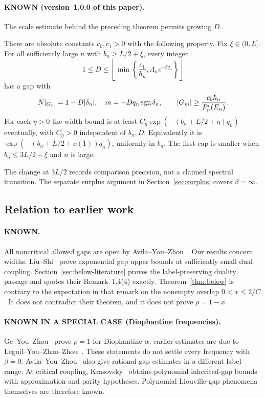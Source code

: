 \paragraph{KNOWN (version~1.0.0 of this paper).}
The scale estimate behind the preceding theorem permits growing $D$.
\begin{maintheorem}\label{thm:scale}
There are absolute constants $c_0,c_1>0$ with the following property. Fix $\xi\in(0,L]$. For all sufficiently large $n$ with $b_n\ge L/2+\xi$, every integer
\begin{equation}\label{eq:Dcap}
1\le D\le
\left\lfloor\min\left\{\frac{c_1}{\hbar_n},
                 \Lambda_ne^{-\xi q_n}\right\}\right\rfloor
\end{equation}
has a gap with
\begin{equation}\label{eq:width}
 N|_{G_m}=1-D|\delta_n|,\quad m=-Dq_n\operatorname{sgn}\delta_n,\qquad
 |G_m|\ge\frac{c_0\hbar_n}{P_n'(E_n)}.
\end{equation}
For each $\eta>0$ the width bound is at least
$C_\eta\exp(-(b_n+L/2+\eta)q_n)$ eventually, with $C_\eta>0$ independent of $b_n,D$.
Equivalently it is $\exp(-(b_n+L/2+o(1))q_n)$, uniformly in $b_n$.
The first cap is smaller when $b_n\le3L/2-\xi$ and $n$ is large.
\end{maintheorem}
The change at $3L/2$ records comparison precision, not a claimed spectral transition. The separate surplus argument in Section~\ref{sec:surplus} covers $\beta=\infty$.

\subsection{Relation to earlier work}
\paragraph{KNOWN.}
All noncritical allowed gaps are open by Avila--You--Zhou~\cite[Theorem~1.1]{AYZdry}. Our results concern widths. Liu--Shi~\cite[Theorem~1.3]{LiuShi2019} prove exponential gap upper bounds at sufficiently small dual coupling. Section~\ref{sec:below-literature} proves the label-preserving duality passage and quotes their Remark~1.4(4) exactly. Theorem~\ref{thm:below} is contrary to the expectation in that remark on the nonempty overlap $0<x\le2/C$. It does not contradict their theorem, and it does not prove $\rho=1-x$.

\paragraph{KNOWN IN A SPECIAL CASE (Diophantine frequencies).}
Ge--You--Zhou~\cite[Theorem~1.1]{GYZ} prove $\rho=1$ for Diophantine $\alpha$; earlier estimates are due to Leguil--You--Zhao--Zhou~\cite{LYZZ2017}. These statements do not settle every frequency with $\beta=0$. Avila--You--Zhou~\cite[Theorem~6.2]{AYZdry} also give rational-gap estimates in a different label range. At critical coupling, Krasovsky~\cite[Theorems~3--4]{Krasovsky} obtains polynomial inherited-gap bounds with approximation and parity hypotheses. Polynomial Liouville-gap phenomena themselves are therefore known.

